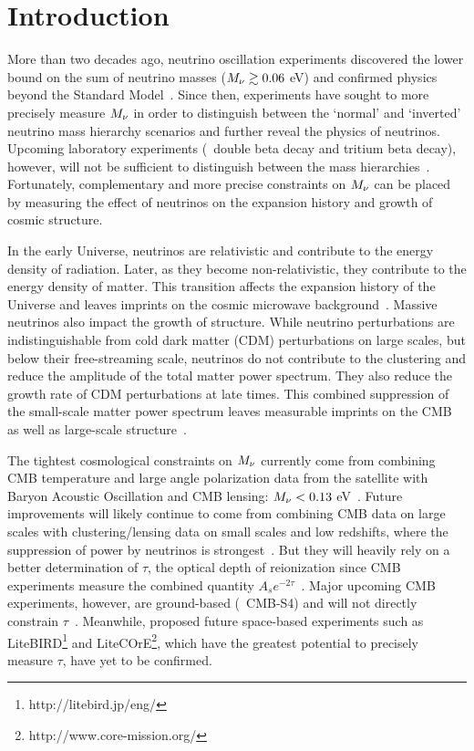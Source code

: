 \section{Introduction} \label{sec:intro}
More than two decades ago, neutrino oscillation experiments discovered the lower
bound on the sum of neutrino masses ($M_\nu \gtrsim 0.06$ eV) and confirmed
physics beyond the Standard Model~\citep{fukuda1998, forero2014, gonzalez-garcia2016}. 
Since then, experiments have sought to more precisely measure $M_\nu$ in order
to distinguish between the `normal' and `inverted' neutrino mass hierarchy
scenarios and further reveal the physics of neutrinos. Upcoming laboratory 
experiments (\eg~double beta decay and tritium beta decay), however, will not
be sufficient to distinguish between the mass hierarchies~\citep{bonn2011, drexlin2013}.
Fortunately, complementary and more precise constraints on $M_\nu$ can be
placed by measuring the effect of neutrinos on the expansion history and growth
of cosmic structure. 

In the early Universe, neutrinos are relativistic and contribute to the 
energy density of radiation. Later, as they become non-relativistic, 
they contribute to the energy density of matter. This transition affects 
the expansion history of the Universe and leaves imprints on the cosmic
microwave background~\citep[CMB][]{lesgourgues2012, lesgourgues2014}. 
Massive neutrinos also impact the growth of structure. 
While neutrino perturbations are indistinguishable from cold dark matter (CDM)
perturbations on large scales, but below their free-streaming scale, neutrinos 
do not contribute to the clustering and reduce the 
amplitude of the total matter power spectrum. They also reduce the growth 
rate of CDM perturbations at late times. This combined suppression of 
the small-scale matter power spectrum leaves measurable imprints 
on the CMB as well as large-scale structure~\citep[for further details see][]{lesgourgues2012, lesgourgues2014, gerbino2018}. 

The tightest cosmological constraints on $M_\nu$ currently come from 
combining CMB temperature and large angle polarization data from the 
\planck satellite with Baryon Acoustic Oscillation and CMB lensing: 
$M_\nu < 0.13$ eV~\citep{planckcollaboration2018}. Future improvements
will likely continue to come from combining CMB data on large scales 
with clustering/lensing data on small scales and low redshifts, where 
the suppression of power by neutrinos is strongest~\citep{brinckmann2019}. 
But they will heavily rely on a better determination of $\tau$, the optical
depth of reionization since CMB experiments measure the combined quantity $A_s
e^{-2\tau}$~\citep{allison2015, liu2016, archidiacono2017}.
Major upcoming CMB experiments, however, are ground-based (\eg~CMB-S4) and 
will not directly constrain $\tau$~\citep{abazajian2016}. Meanwhile, proposed
future space-based experiments such as
LiteBIRD\footnote{http://litebird.jp/eng/} and 
LiteCOrE\footnote{http://www.core-mission.org/}, which have the greatest 
potential to precisely measure $\tau$, have yet to be confirmed. 

